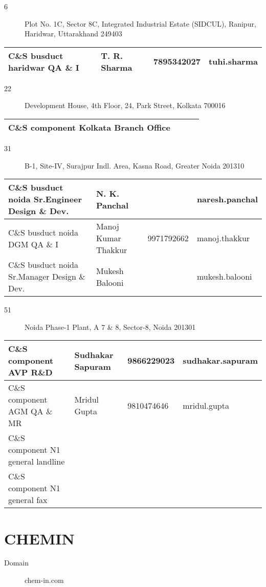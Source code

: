 \documentclass[a4paper, 11pt, twoside]{book}
\begin{document}
\begin{description}
\item [6]Plot No. 1C, Sector 8C, Integrated Industrial Estate (SIDCUL), Ranipur, Haridwar, Uttarakhand 249403
\end{description}
\begin{tabular}{|p{4cm}|p{2cm}|p{2cm}|p{3cm}|}
\hline
C\&S busduct haridwar QA \& I & T. R. Sharma & 7895342027 & tuhi.sharma \\ \hline
\end{tabular}
\begin{description}
\item [22]Development House, 4th Floor, 24, Park Street, Kolkata 700016
\end{description}
\begin{tabular}{|p{4cm}|p{2cm}|p{2cm}|p{3cm}|}
\hline
C\&S component Kolkata Branch Office & & &  \\ \hline
\end{tabular}
\begin{description}
\item [31]B-1, Site-IV, Surajpur Indl. Area, Kasna Road, Greater Noida 201310
\end{description}
\begin{tabular}{|p{4cm}|p{2cm}|p{2cm}|p{3cm}|}
\hline
C\&S busduct noida Sr.Engineer Design \& Dev. & N. K. Panchal &  & naresh.panchal \\ \hline
C\&S busduct noida DGM QA \& I & Manoj Kumar Thakkur & 9971792662 & manoj.thakkur \\ \hline
C\&S busduct noida Sr.Manager Design \& Dev. & Mukesh Balooni &  & mukesh.balooni \\ \hline
\end{tabular}
\begin{description}
\item [51]Noida Phase-1 Plant, A 7 \& 8, Sector-8, Noida 201301
\end{description}
\begin{tabular}{|p{4cm}|p{2cm}|p{2cm}|p{3cm}|}
\hline
C\&S component AVP R\&D & Sudhakar Sapuram & 9866229023 & sudhakar.sapuram \\ \hline
C\&S component AGM QA \& MR & Mridul Gupta & 9810474646 & mridul.gupta \\ \hline
C\&S component N1 general landline  & & &  \\ \hline
C\&S component N1 general fax & & &  \\ \hline
\end{tabular}
\section{CHEMIN}\label{com:43}
\begin{description}
\item[Domain]chem-in.com
\end{description}
\end{document}
